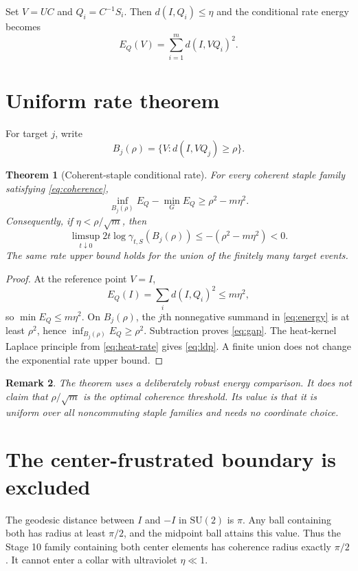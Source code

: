 \documentclass[11pt]{article}
\newtheorem{theorem}{Theorem}[section]
\newtheorem{remark}[theorem]{Remark}
\newcommand{\SU}{\mathrm{SU}(2)}
\begin{document}
Set $V=UC$ and $Q_i=C^{-1}S_i$.  Then $d(I,Q_i)\leq\eta$ and the conditional
rate energy becomes
\begin{equation}
 E_Q(V)=\sum_{i=1}^{m}d(I,VQ_i)^2.
 \label{eq:energy}
\end{equation}

\section{Uniform rate theorem}

For target $j$, write
\[
 B_j(\rho)=\{V:d(I,VQ_j)\geq\rho\}.
\]

\begin{theorem}[Coherent-staple conditional rate]
For every coherent staple family satisfying \eqref{eq:coherence},
\begin{equation}
 \inf_{B_j(\rho)}E_Q-\min_G E_Q\geq \rho^2-m\eta^2.
 \label{eq:gap}
\end{equation}
Consequently, if $\eta<\rho/\sqrt m$, then
\begin{equation}
 \limsup_{t\downarrow0}2t\log\gamma_{t,S}(B_j(\rho))
 \leq-(\rho^2-m\eta^2)<0.
 \label{eq:ldp}
\end{equation}
The same rate upper bound holds for the union of the finitely many target
events.
\end{theorem}
\begin{proof}
At the reference point $V=I$,
\[
 E_Q(I)=\sum_i d(I,Q_i)^2\leq m\eta^2,
\]
so $\min E_Q\leq m\eta^2$.  On $B_j(\rho)$, the $j$th nonnegative summand in
\eqref{eq:energy} is at least $\rho^2$, hence
$\inf_{B_j(\rho)}E_Q\geq\rho^2$.  Subtraction proves \eqref{eq:gap}.
The heat-kernel Laplace principle from \eqref{eq:heat-rate} gives
\eqref{eq:ldp}.  A finite union does not change the exponential rate upper
bound.
\end{proof}

\begin{remark}
The theorem uses a deliberately robust energy comparison.  It does not claim
that $\rho/\sqrt m$ is the optimal coherence threshold.  Its value is that it
is uniform over all noncommuting staple families and needs no coordinate
choice.
\end{remark}

\section{The center-frustrated boundary is excluded}

The geodesic distance between $I$ and $-I$ in $\SU$ is $\pi$.  Any ball
containing both has radius at least $\pi/2$, and the midpoint ball attains this
value.  Thus the Stage 10 family containing both center elements has coherence
radius exactly $\pi/2$.  It cannot enter a collar with ultraviolet
$\eta\ll1$.
\end{document}
